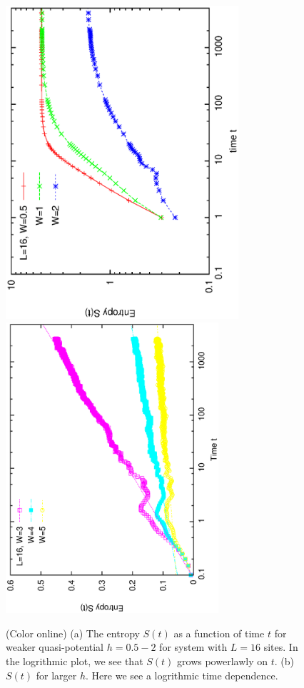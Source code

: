 \documentclass[prl,aps,epsf,showpacs,twocolumn]{revtex4}
\begin{document}
\begin{figure}[b]
 \includegraphics[angle=-90, origin=c,  width=3.4in]{newfig1a.ps}\\
\vspace{-0.6in}
 \includegraphics[angle=-90,width=3.1in]{newfig1b.ps}\\
\vspace{0.1in}
\caption{(Color online) (a) The entropy $S(t)$ as a function of time $t$ for weaker quasi-potential
$h=0.5-2$ for system with $L=16$ sites.   In the logrithmic plot,  we see that $S(t)$ grows powerlawly on $t$.
(b) $S(t)$ for larger $h$.  Here we see a logrithmic time dependence.
 }
\label{fig1}
\end{figure}
\end{document}
